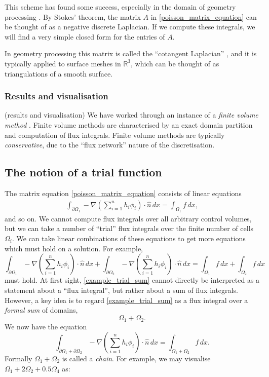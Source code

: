 \documentclass[11pt,a4paper]{memoir}
\newcommand{\om}{{\Omega}}
\newcommand{\pom}{{\partial\Omega}}
\begin{document}
This scheme has found some success, especially in the domain of geometry processing \cite{polygon_mesh_processing}.
By Stokes' theorem, the matrix $A$ in \eqref{poisson_matrix_equation} can be thought of as a negative discrete Laplacian.
If we compute these integrals, we will find a very simple closed form for the entries of $A$.

In geometry processing this matrix is called the ``cotangent Laplacian'' \cite{polygon_mesh_processing}, and it is typically
applied to surface meshes in $\mathbb{R}^3$, which can be thought of as triangulations of a smooth surface.

\subsubsection{Results and visualisation}
\vskip 0.2in
(results and visualisation)
\vskip 0.2in
We have worked through an instance of a \textit{finite volume method} \cite{pde_larsson}.
Finite volume methods are characterised by an exact domain partition and computation of flux integrals.
Finite volume methods are typically \textit{conservative}, due to the ``flux network'' nature of the discretisation.

\subsection{The notion of a trial function}\label{trial_function}
The matrix equation \eqref{poisson_matrix_equation} consists of linear equations
\begin{align*}
    \int_{\pom_1} -\nabla \left(\sum_{i=1}^n h_i\phi_i\right) \cdot \hat{n}\,dx
    =
    \int_{\om_1}f\,dx,
\end{align*}
and so on. We cannot compute flux integrals
over all arbitrary control volumes, but we can take a number of ``trial'' flux integrals over the finite number of cells $\Omega_i$.
We can take linear combinations of these equations to get more equations which must hold on a solution.
For example,
\begin{equation}\label{example_trial_sum}
    \int_{\pom_1} -\nabla \left(\sum_{i=1}^n h_i\phi_i\right) \cdot \hat{n}\,dx
    +
    \int_{\pom_2} -\nabla \left(\sum_{i=1}^n h_i\phi_i\right) \cdot \hat{n}\,dx
    =
    \int_{\om_1}f\,dx
    +
    \int_{\om_2}f\,dx
\end{equation}
must hold. At first sight, \eqref{example_trial_sum} cannot directly be interpreted as a statement about a ``flux integral'', but rather about a sum
of flux integrals. However, a key idea is to regard \eqref{example_trial_sum} as a flux integral over a \textit{formal sum} of domains,
    $$\Omega_1 + \Omega_2.$$
We now have the equation
\begin{equation}
    \int_{\pom_1 + \pom_2} -\nabla \left(\sum_{i=1}^n h_i\phi_i\right) \cdot \hat{n}\,dx
    =
    \int_{\om_1 + \om_2}f\,dx.
\end{equation}
Formally $\Omega_1 + \Omega_2$ is called a \textit{chain}. For example, we may visualise $\Omega_1 + 2\Omega_2 + 0.5\Omega_4$ as:
\end{document}
